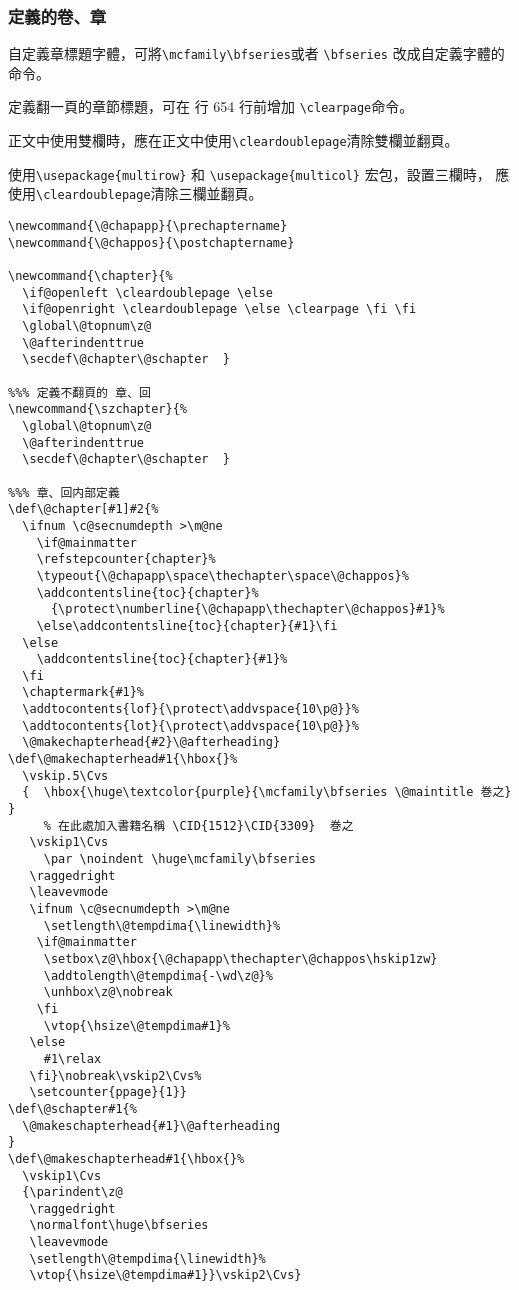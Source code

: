 \subsubsection{定義的卷、章}

\par 自定義章標題字體，可將\verb+\mcfamily\bfseries+或者 \verb+\bfseries+
改成自定義字體的命令。
\par 定義翻一頁的章節標題，可在 行 654 行前增加 \verb+\clearpage+命令。
\par 正文中使用雙欄時，應在正文中使用\verb+\cleardoublepage+清除雙欄並翻頁。
\par 使用\verb+\usepackage{multirow}+ 和 \verb+\usepackage{multicol}+ 宏包，設置三欄時，
應使用\verb+\cleardoublepage+清除三欄並翻頁。
\begin{lstlisting}[firstnumber=642]
\newcommand{\@chapapp}{\prechaptername}
\newcommand{\@chappos}{\postchaptername}

\newcommand{\chapter}{%
  \if@openleft \cleardoublepage \else
  \if@openright \cleardoublepage \else \clearpage \fi \fi
  \global\@topnum\z@
  \@afterindenttrue
  \secdef\@chapter\@schapter  }

%%% 定義不翻頁的 章、回
\newcommand{\szchapter}{%
  \global\@topnum\z@
  \@afterindenttrue
  \secdef\@chapter\@schapter  }

%%% 章、回内部定義
\def\@chapter[#1]#2{%
  \ifnum \c@secnumdepth >\m@ne
    \if@mainmatter
    \refstepcounter{chapter}%
    \typeout{\@chapapp\space\thechapter\space\@chappos}%
    \addcontentsline{toc}{chapter}%
      {\protect\numberline{\@chapapp\thechapter\@chappos}#1}%
    \else\addcontentsline{toc}{chapter}{#1}\fi
  \else
    \addcontentsline{toc}{chapter}{#1}%
  \fi
  \chaptermark{#1}%
  \addtocontents{lof}{\protect\addvspace{10\p@}}%
  \addtocontents{lot}{\protect\addvspace{10\p@}}%
  \@makechapterhead{#2}\@afterheading}
\def\@makechapterhead#1{\hbox{}%
  \vskip.5\Cvs
  {  \hbox{\huge\textcolor{purple}{\mcfamily\bfseries \@maintitle 巻之} }
  	 % 在此處加入書籍名稱 \CID{1512}\CID{3309}  巻之
   \vskip1\Cvs
     \par \noindent \huge\mcfamily\bfseries
   \raggedright
   \leavevmode
   \ifnum \c@secnumdepth >\m@ne
     \setlength\@tempdima{\linewidth}%
    \if@mainmatter
     \setbox\z@\hbox{\@chapapp\thechapter\@chappos\hskip1zw}
     \addtolength\@tempdima{-\wd\z@}%
     \unhbox\z@\nobreak
    \fi
     \vtop{\hsize\@tempdima#1}%
   \else
     #1\relax
   \fi}\nobreak\vskip2\Cvs%
   \setcounter{ppage}{1}}
\def\@schapter#1{%
  \@makeschapterhead{#1}\@afterheading
}
\def\@makeschapterhead#1{\hbox{}%
  \vskip1\Cvs
  {\parindent\z@
   \raggedright
   \normalfont\huge\bfseries
   \leavevmode
   \setlength\@tempdima{\linewidth}%
   \vtop{\hsize\@tempdima#1}}\vskip2\Cvs}
\end{lstlisting}


